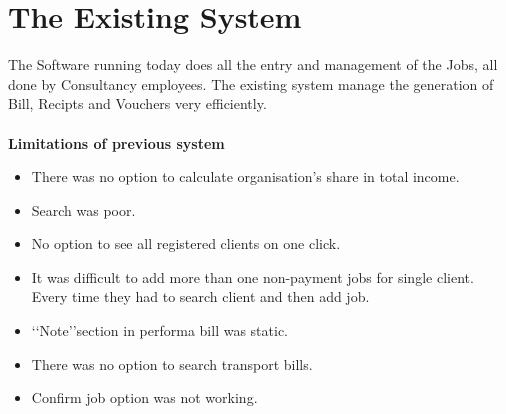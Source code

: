 \section{The Existing System}

The Software running today does all the entry and management of the Jobs, all done by Consultancy employees. The existing system manage the generation of Bill, Recipts and Vouchers very efficiently.\\\\
{\bf {Limitations of previous system }}
\begin{itemize}
\item There was no option to calculate organisation's share in total income.

\item Search was poor.

\item No option to see all registered clients on one click.

\item It was difficult to add more than one non-payment jobs for single client. 
Every time they had to search client and then add job.

\item \lq\lq Note\rq\rq section in performa bill was static.

\item There was no option to search transport bills.

\item Confirm job option was not working.
\end{itemize}

